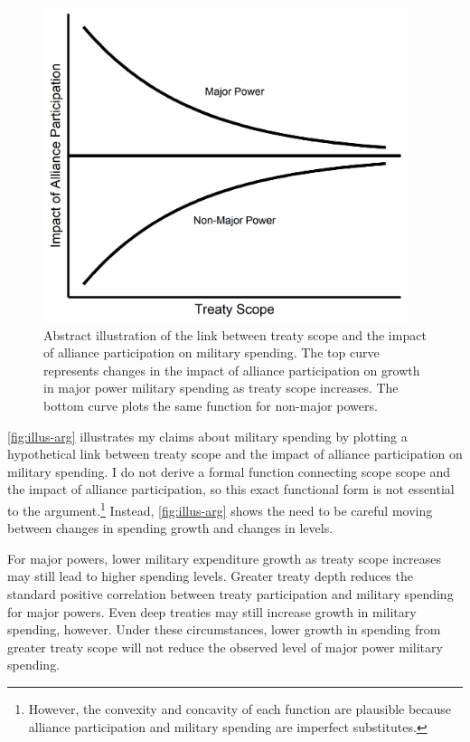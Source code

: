 \documentclass[12pt]{article}
\begin{document}
\begin{figure}[htbp]
	\centering
		\includegraphics[width=0.95\textwidth]{../figures/illus-arg.png}
	\caption{Abstract illustration of the link between treaty scope and the impact of alliance participation on military spending.
	The top curve represents changes in the impact of alliance participation on growth in major power military spending as treaty scope increases.
	The bottom curve plots the same function for non-major powers.}
	\label{fig:illus-arg}
\end{figure}


\autoref{fig:illus-arg} illustrates my claims about military spending by plotting a hypothetical link between treaty scope and the impact of alliance participation on military spending. 
I do not derive a formal function connecting scope scope and the impact of alliance participation, so this exact functional form is not essential to the argument.\footnote{However, the convexity and concavity of each function are plausible because alliance participation and military spending are imperfect substitutes.}  
Instead, \autoref{fig:illus-arg} shows the need to be careful moving between changes in spending growth and changes in levels. 


For major powers, lower military expenditure growth as treaty scope increases may still lead to higher spending levels. 
Greater treaty depth reduces the standard positive correlation between treaty participation and military spending for major powers. 
Even deep treaties may still increase growth in military spending, however. 
Under these circumstances, lower growth in spending from greater treaty scope will not reduce the observed level of major power military spending. 
\end{document}
